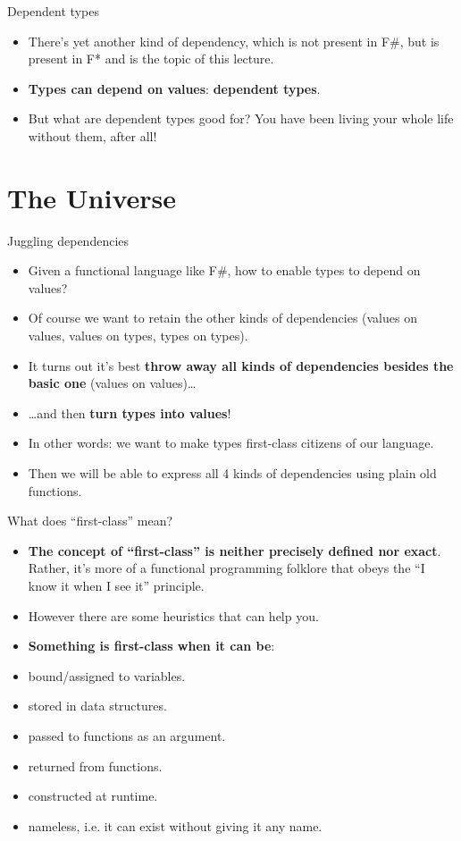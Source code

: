 \documentclass{beamer}
\begin{document}
\begin{frame}{Dependent types}
\begin{itemize}
	\item There's yet another kind of dependency, which is not present in F\#, but is present in F* and is the topic of this lecture.
	\item \textbf{Types can depend on values}: \textbf{dependent types}.
	\item But what are dependent types good for? You have been living your whole life without them, after all!
\end{itemize}
\end{frame}

\section{The Universe}

\begin{frame}{Juggling dependencies}
\begin{itemize}
	\item Given a functional language like F\#, how to enable types to depend on values?
	\item Of course we want to retain the other kinds of dependencies (values on values, values on types, types on types).
	\item It turns out it's best \textbf{throw away all kinds of dependencies besides the basic one} (values on values)\dots
	\item \dots and then \textbf{turn types into values}!
	\item In other words: we want to make types first-class citizens of our language.
	\item Then we will be able to express all 4 kinds of dependencies using plain old functions.
\end{itemize}
\end{frame}

\begin{frame}{What does ``first-class'' mean?}
\begin{itemize}
	\item \textbf{The concept of ``first-class'' is neither precisely defined nor exact}. Rather, it's more of a functional programming folklore that obeys the ``I know it when I see it'' principle.
	\item However there are some heuristics that can help you.
	\item \textbf{Something is first-class when it can be}:
	\item bound/assigned to variables.
	\item stored in data structures.
	\item passed to functions as an argument.
	\item returned from functions.
	\item constructed at runtime.
	\item nameless, i.e. it can exist without giving it any name.
\end{itemize}
\end{frame}
\end{document}
